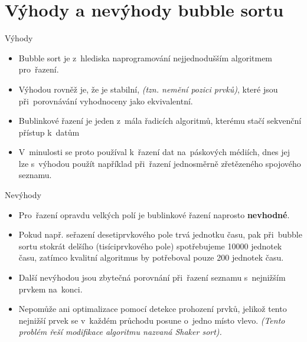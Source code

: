 \documentclass[10pt, hyperref={unicode}]{beamer}
\begin{document}
\section{Výhody a nevýhody bubble sortu}

\begin{frame}{Výhody}
	\begin{itemize}
		\item
			Bubble sort je z~hlediska naprogramování nejjednodušším algoritmem pro~řazení.
		\item	
			Výhodou rovněž je, že je stabilní, \textit{(tzn. nemění pozici prvků)}, které jsou při~porovnávání vyhodnoceny jako ekvivalentní. 
		\item
		    Bublinkové řazení je jeden z~mála řadicích algoritmů, kterému stačí sekvenční přístup k~datům
		\item
		    V~minulosti se proto používal k~řazení dat na~páskových médiích, dnes jej lze s~výhodou použít například při~řazení jednosměrně zřetězeného spojového seznamu. 
	\end{itemize}
\end{frame}

\begin{frame}[fragile]{Nevýhody}
	\begin{alertblock}{{}}
		\begin{itemize}
			\item Pro~řazení opravdu velkých polí je bublinkové řazení naprosto \textbf{nevhodné}.
			\item Pokud např. seřazení desetiprvkového pole trvá jednotku času, pak při~bubble sortu stokrát delšího (tisíciprvkového pole) spotřebujeme 10000 jednotek času, zatímco kvalitní algoritmus by potřeboval pouze 200 jednotek času.
			\item Další nevýhodou jsou zbytečná porovnání při~řazení seznamu s~nejnižším prvkem na~konci.
			\item Nepomůže ani optimalizace pomocí detekce prohození prvků, jelikož tento nejnižší prvek se v~každém průchodu posune o~jedno místo vlevo. \textit{(Tento problém řeší modifikace algoritmu nazvaná Shaker sort).} 
		\end{itemize}
	\end{alertblock}
\end{frame}
\end{document}
